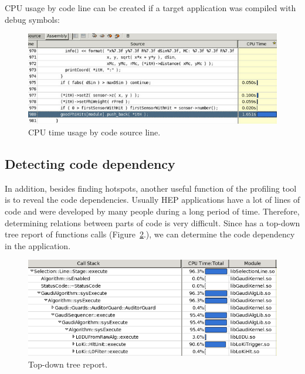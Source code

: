 \documentclass[a4paper]{jpconf}
\begin{document}
CPU usage by code line can be created if a target application was compiled with debug symbols:

\begin{figure}[H]
\begin{minipage}{\textwidth}
\includegraphics[width=\textwidth]{figs/fig05.png}
\caption{\label{fig05}CPU time usage by code source line.}
\end{minipage}
\end{figure}

\subsection{Detecting code dependency}

In addition, besides finding hotspots, another useful function of the profiling tool is to reveal the code dependencies. 
Usually HEP applications have a lot of lines of code and were developed by many people during a long period of time. 
Therefore, determining relations between parts of code is very difficult. Since \amp  has a top-down tree report of 
functions calls (Figure~\ref{fig06}.),  we can determine the code dependency in the application.

\begin{figure}[H]
\begin{minipage}{\textwidth}
\includegraphics[width=\textwidth]{figs/fig06.png}
\caption{\label{fig06}Top-down tree report.}
\end{minipage}
\end{figure}
\end{document}
